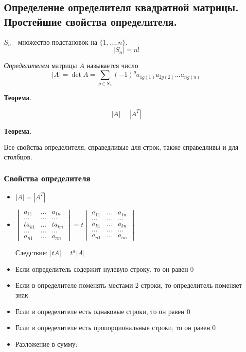 \documentclass[a4paper]{article}
\begin{document}
\subsection*{Определение определителя квадратной матрицы. Простейшие свойства определителя.}
$S_n$ - множество подстановок на $\{ 1, ..., n\}$.
\[ |S_n| = n! \]

\textit{Определителем} матрицы $A$ называется число 
\[ |A| = \det A = \sum_{g \in S_n} (-1)^g a_{1 g(1)} a_{2 g(2)} ... a_{n g(n)} \]


\begin{htheorem}\textbf{Теорема}.

\[ |A| = |A^T| \]
\end{htheorem}

\begin{htheorem}\textbf{Теорема}.

Все свойства определителя, справедливые для строк, также справедливы и для столбцов.


\subsubsection*{Свойства определителя}
\begin{itemize}
\item $|A| = |A^T|$
\item $\begin{vmatrix}
a_{11} & ... & a_{1n} \\ ... & ... & ... \\ ta_{k1} & ... & ta_{kn} \\ ... & ... & ... \\ a_{n1} & ... & a_{nn}
\end{vmatrix} = t \begin{vmatrix}
a_{11} & ... & a_{1n} \\ ... & ... & ... \\ a_{k1} & ... & a_{kn} \\ ... & ... & ... \\ a_{n1} & ... & a_{nn}
\end{vmatrix}$

Следствие: $|tA| = t^n|A|$

\item Если определитель содержит нулевую строку, то он равен 0
\item Если в определителе поменять местами 2 строки, то определитель поменяет знак
\item Если в определителе есть однаковые строки, то он равен 0
\item Если в определителе есть пропорциональные строки, то он равен 0
\item Разложение в сумму:


\end{itemize}
\end{htheorem}
\end{document}
